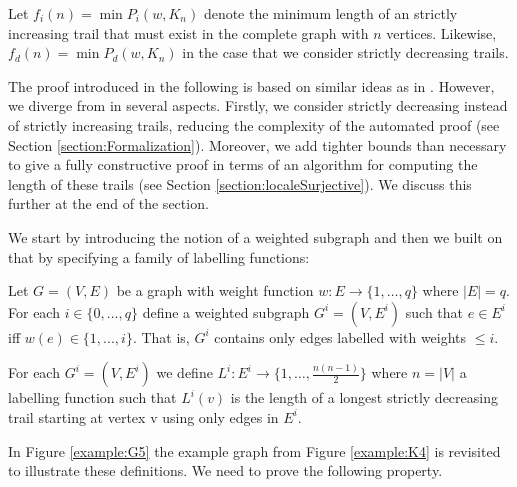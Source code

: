 \begin{isabellebody}
\begin{isamarkuptext}
Let $f_i(n) = \min P_i(w,K_n)$ denote the minimum length of an strictly increasing trail that must exist in 
the complete graph with $n$ vertices. Likewise, $f_d(n) = \min P_d(w,K_n)$ in the case that we consider 
strictly decreasing trails.%
\end{isamarkuptext}\isamarkuptrue%
%
\isadelimdocument
%
\endisadelimdocument
%
\isatagdocument
%
\isamarkuptrue%
%
\endisatagdocument
{\isafolddocument}%
%
\isadelimdocument
%
\endisadelimdocument
%
\begin{isamarkuptext}%
\label{symbolicProof}
The proof introduced in the following is based on similar ideas as in \cite{graham1973increasing}. 
However, we diverge from \cite{graham1973increasing} in several aspects. Firstly, we consider strictly decreasing instead of strictly increasing trails,
reducing the complexity of the automated proof (see Section \ref{section:Formalization}). 
Moreover, we add tighter bounds than necessary to give a fully constructive proof in terms of an algorithm for computing
the length of these trails (see Section \ref{section:localeSurjective}). We discuss this further at the end of the section.

We start by introducing the notion of a weighted subgraph and then we built on that by specifying a family of labelling functions:

\begin{definition} \label{def:weightedSubgraph}
	Let $G=(V,E)$ be a graph with weight function $w:E\rightarrow \{1,\ldots,q\}$ where $|E| = q$.
	For each $i\in \{0,...,q\}$ define a weighted subgraph $G^i = (V,E^i)$ such that $e\in E^i$ iff $w(e)\in \{1,...,i\}$. 
  That is, $G^i$ contains only edges labelled with weights $\le i$.
\end{definition}

\begin{definition}\label{def:Labelling}
	For each $G^i=(V,E^i)$ we define $L^i:E^i\rightarrow \{1,\ldots,\frac{n(n-1)}{2}\}$ where $n = |V|$ a labelling function such 
that $L^i(v)$ is the length of a longest strictly decreasing trail starting at vertex v using only edges in $E^i$.
\end{definition}

\noindent In Figure \ref{example:G5} the example graph from Figure \ref{example:K4} is revisited to 
illustrate these definitions. We need to prove the following property.


\end{isamarkuptext}
\end{isabellebody}
